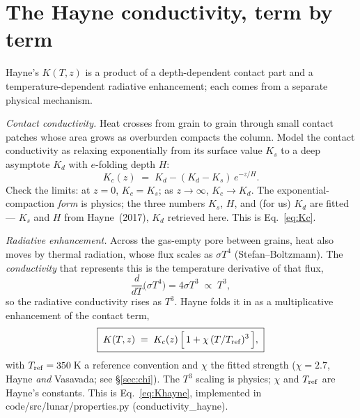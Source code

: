 \documentclass[11pt]{report}
\newcommand{\code}[1]{{\ttfamily\small #1}}
\begin{document}
\section{The Hayne conductivity, term by term}\label{app:hayne}
Hayne's $K(T,z)$ is a product of a depth-dependent contact part and a
temperature-dependent radiative enhancement; each comes from a separate physical
mechanism.

\emph{Contact conductivity.} Heat crosses from grain to grain through small
contact patches whose area grows as overburden compacts the column. Model the
contact conductivity as relaxing exponentially from its surface value $K_s$ to a
deep asymptote $K_d$ with $e$-folding depth $H$:
\[
K_c(z) \;=\; K_d - (K_d - K_s)\,e^{-z/H}.
\]
Check the limits: at $z=0$, $K_c=K_s$; as $z\to\infty$, $K_c\to K_d$. The
exponential-compaction \emph{form} is physics; the three numbers $K_s$, $H$, and
(for us) $K_d$ are fitted --- $K_s$ and $H$ from Hayne~(2017), $K_d$ retrieved
here. This is Eq.~\eqref{eq:Kc}.

\emph{Radiative enhancement.} Across the gas-empty pore between grains, heat also
moves by thermal radiation, whose flux scales as $\sigma T^4$
(Stefan--Boltzmann). The \emph{conductivity} that represents this is the
temperature derivative of that flux,
\[
\frac{d}{dT}\big(\sigma T^4\big) = 4\sigma T^3 \;\propto\; T^3,
\]
so the radiative conductivity rises as $T^3$. Hayne folds it in as a
multiplicative enhancement of the contact term,
\[
\boxed{\;K(T,z) \;=\; K_c(z)\,\Big[\,1 + \chi\,(T/T_{\rm ref})^3\,\Big],\;}
\]
with $T_{\rm ref}=350$\,K a reference convention and $\chi$ the fitted strength
($\chi=2.7$, Hayne \emph{and} Vasavada; see \S\ref{sec:chi}). The $T^3$ scaling
is physics; $\chi$ and $T_{\rm ref}$ are Hayne's constants. This is
Eq.~\eqref{eq:Khayne}, implemented in \code{code/src/lunar/properties.py}
(\code{conductivity\_hayne}).
\end{document}

